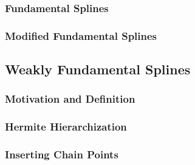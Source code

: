 
\subsubsection{Fundamental Splines}


\subsubsection{Modified Fundamental Splines}


\subsection{Weakly Fundamental Splines}


\subsubsection{Motivation and Definition}


\subsubsection{Hermite Hierarchization}


\subsubsection{Inserting Chain Points}


\cite{zenger91}

\blindmathpaper
